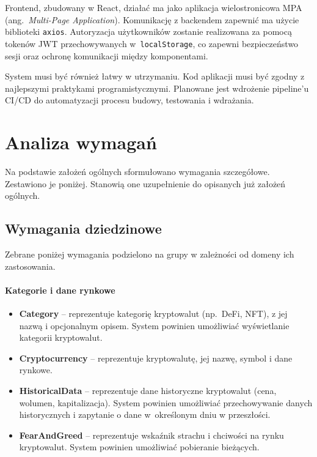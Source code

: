 Frontend, zbudowany w React, działać ma jako aplikacja wielostronicowa MPA (ang.~\emph{Multi-Page Application}). Komunikację z backendem zapewnić ma użycie biblioteki \texttt{axios}. Autoryzacja użytkowników zostanie realizowana za pomocą tokenów JWT przechowywanych w~\texttt{localStorage}, co zapewni bezpieczeństwo sesji oraz ochronę komunikacji między komponentami.

System musi być również łatwy w utrzymaniu. Kod aplikacji musi być zgodny z najlepszymi praktykami programistycznymi. Planowane jest wdrożenie pipeline’u CI/CD do automatyzacji procesu budowy, testowania i wdrażania.


\section{Analiza wymagań}
Na podstawie założeń ogólnych sformułowano wymagania szczegółowe. Zestawiono je poniżej. Stanowią one uzupełnienie do opisanych już założeń ogólnych. 
\subsection{Wymagania dziedzinowe}
Zebrane poniżej wymagania podzielono na grupy w zależności od domeny ich zastosowania. %

\paragraph{Kategorie i dane rynkowe}
\begin{itemize}
\item \textbf{Category} -- reprezentuje kategorię kryptowalut (np.\ DeFi, NFT), z jej nazwą i opcjonalnym opisem. System powinien umożliwiać wyświetlanie kategorii kryptowalut.
\item \textbf{Cryptocurrency} -- reprezentuje kryptowalutę, jej nazwę, symbol i dane rynkowe.
\item \textbf{HistoricalData} -- reprezentuje dane historyczne kryptowalut (cena, wolumen, kapitalizacja). System powinien umożliwiać przechowywanie danych historycznych i zapytanie o dane w~określonym dniu w przeszłości.
\item \textbf{FearAndGreed} -- reprezentuje wskaźnik strachu i chciwości na rynku kryptowalut. System powinien umożliwiać pobieranie bieżących.
\end{itemize}

